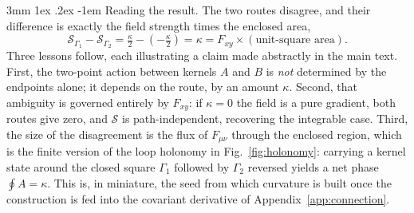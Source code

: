 \documentclass[%
 reprint, amsmath,amssymb, aps, prb, ]{revtex4-2}
\makeatletter
\numberwithin{equation}{section}
\renewcommand\paragraph{%
  \@startsection{paragraph}{4}{\z@}%
    {3mm \@plus 1ex \@minus .2ex}%
    {-1em}%
    {\normalfont\normalsize\itshape}}
\makeatother
\begin{document}
\paragraph{Reading the result.}
The two routes disagree, and their difference is exactly the field strength times the enclosed area,
\begin{equation}
\mathcal{S}_{\Gamma_1}-\mathcal{S}_{\Gamma_2} = \tfrac{\kappa}{2}-\left(-\tfrac{\kappa}{2}\right) = \kappa = F_{xy}\times(\text{unit-square area}).
\label{eq:worked-diff}
\end{equation}
Three lessons follow, each illustrating a claim made abstractly in the main text. First, the two-point action between kernels $A$ and $B$ is \emph{not} determined by the endpoints alone; it depends on the route, by an amount $\kappa$. Second, that ambiguity is governed entirely by $F_{xy}$: if $\kappa=0$ the field is a pure gradient, both routes give zero, and $\mathcal{S}$ is path-independent, recovering the integrable case. Third, the size of the disagreement is the flux of $F_{\mu\nu}$ through the enclosed region, which is the finite version of the loop holonomy in Fig.~\ref{fig:holonomy}: carrying a kernel state around the closed square $\Gamma_1$ followed by $\Gamma_2$ reversed yields a net phase $\oint A = \kappa$. This is, in miniature, the seed from which curvature is built once the construction is fed into the covariant derivative of Appendix~\ref{app:connection}.
\end{document}
